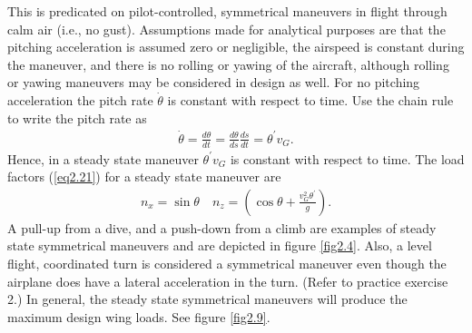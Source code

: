 \documentclass{AeroStructure-ERJohnson}
\begin{document}
This is predicated on pilot-controlled, symmetrical maneuvers in flight through calm air (i.e., no gust). Assumptions made for analytical purposes are that the pitching acceleration is assumed zero or negligible, the airspeed is constant during the maneuver, and there is no rolling or yawing of the aircraft, although rolling or yawing maneuvers may be considered in design as well. For no pitching acceleration the pitch rate $\dot{\theta}$ is constant with respect to time. Use the chain rule to write the pitch rate as
\begin{align}\label{eq2.23}
\dot{\theta}=\frac{d \theta}{d t}=\frac{d \theta}{d s} \frac{d s}{d t}=\theta^{\prime} v_{G}.
\end{align}
Hence, in a steady state maneuver $\theta^{\prime} v_{G}$ is constant with respect to time. The load factors (\ref{eq2.21}) for a steady state maneuver are
\begin{align}\label{eq2.24}
n_{x}=\sin \theta \quad n_{z}=\left(\cos \theta+\frac{v_{G}^{2} \theta^{\prime}}{g}\right).
\end{align}
A pull-up from a dive, and a push-down from a climb are examples of steady state symmetrical maneuvers and are depicted in figure \ref{fig2.4}. Also, a level flight, coordinated turn is considered a symmetrical maneuver even though the airplane does have a lateral acceleration in the turn. (Refer to practice exercise 2.) In general, the steady state symmetrical maneuvers will produce the maximum design wing loads. See figure \ref{fig2.9}.


{\def\thefigure{2.9}
}
\end{document}
